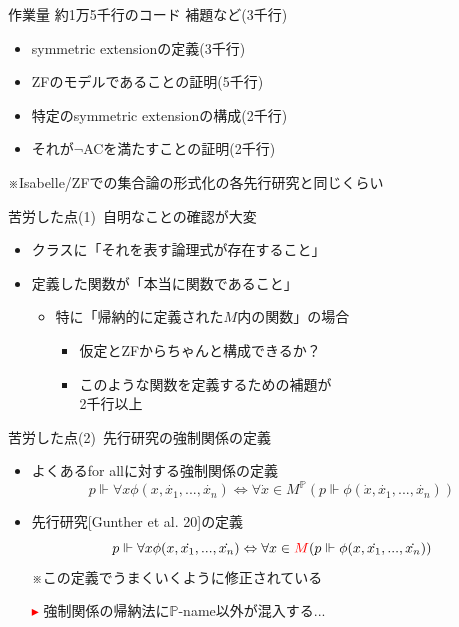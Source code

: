 \documentclass[17pt,aspectratio=169]{beamer}
\newcommand{\Pbb}{\mathbb{P}}
\begin{document}
\begin{frame}{作業量}
    約1万5千行のコード \hspace{0.6cm} {\small 補題など(3千行)}
    {\small
    \begin{itemize}[itemsep=8pt]
        \item symmetric extensionの定義(3千行)
        \item ZFのモデルであることの証明(5千行)
        \item 特定のsymmetric extensionの構成(2千行)
        \item それが$\neg$ACを満たすことの証明(2千行)
    \end{itemize} 

    ※Isabelle/ZFでの集合論の形式化の各先行研究と同じくらい
    }
\end{frame}

\begin{frame}{苦労した点(1)\, {\normalsize 自明なことの確認が大変}}
    \begin{itemize}[left=0cm]
        \item クラスに「それを表す論理式が存在すること」
        \item 定義した関数が「本当に関数であること」
        \vspace{5pt}
        {\small
        \begin{itemize}
            \item 特に「帰納的に定義された$M$内の関数」の場合
            \vspace{5pt}
            {\begin{itemize}[itemsep=5pt]
                \item 仮定とZFからちゃんと構成できるか？
                \item このような関数を定義するための補題が\\
                      2千行以上
            \end{itemize}}
        \end{itemize}
        }
    \end{itemize}
\end{frame}

\begin{frame}{苦労した点(2)\, {\normalsize 先行研究の強制関係の定義}}
    \begin{itemize}[itemsep=9pt]
        \item よくあるfor allに対する強制関係の定義
              $$ p \Vdash \forall x \phi(x, \dot{x_1}, ..., \dot{x_n}) \Leftrightarrow \forall \dot{x} \in M^\Pbb(p \Vdash \phi(\dot{x}, \dot{x_1}, ..., \dot{x_n})) $$
        \item 先行研究{\small [Gunther et al. 20]}の定義
              $$ p \Vdash \forall x \phi(x, \dot{x_1}, ..., \dot{x_n}) \Leftrightarrow \forall x \in \textcolor{red}{M}(p \Vdash \phi(x, \dot{x_1}, ..., \dot{x_n})) $$
              {\small 
                \hspace{0.5cm}※この定義でうまくいくように修正されている
              }
        \item [\textcolor{red}{$\blacktriangleright$}] 強制関係の帰納法に$\Pbb$-name以外が混入する...
    \end{itemize}
\end{frame}
\end{document}
